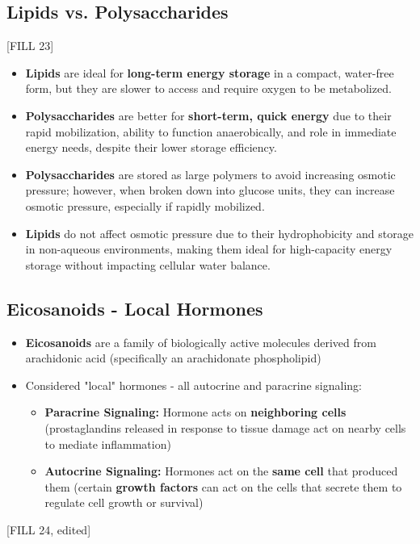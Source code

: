 \documentclass[10pt]{article}
\begin{document}
\subsection*{Lipids vs. Polysaccharides}
\begin{center}
    [FILL 23]
\end{center}
\begin{itemize}
    \item \textbf{Lipids} are ideal for \textbf{long-term energy storage}  in a compact, water-free form, but they are slower to access and require oxygen to be metabolized.  
    \item \textbf{Polysaccharides} are better for \textbf{short-term, quick energy} due to their rapid mobilization, ability to function anaerobically, and role in immediate energy needs, despite their lower storage efficiency.
\end{itemize}
\begin{itemize}
    \item \textbf{Polysaccharides} are stored as large polymers to avoid increasing osmotic pressure; however, when broken down into glucose units, they can increase osmotic pressure, especially if rapidly mobilized.
    \item \textbf{Lipids} do not affect osmotic pressure due to their hydrophobicity and storage in non-aqueous environments, making them ideal for high-capacity energy storage without impacting cellular water balance.
\end{itemize}

\subsection*{Eicosanoids - Local Hormones}
\begin{itemize}
    \item \textbf{Eicosanoids} are a family of biologically active molecules derived from arachidonic acid (specifically an arachidonate phospholipid)
    \item Considered "local" hormones - all autocrine and paracrine signaling:
    \begin{itemize}
        \item \textbf{Paracrine Signaling:} Hormone acts on \textbf{neighboring cells} (prostaglandins released in response to tissue damage act on nearby cells to mediate inflammation)
        \item \textbf{Autocrine Signaling:} Hormones act on the \textbf{same cell} that produced them (certain \textbf{growth factors} can act on the cells that secrete them to regulate cell growth or survival)
    \end{itemize}
\end{itemize}
\begin{center}
    [FILL 24, edited]
\end{center}
\end{document}
